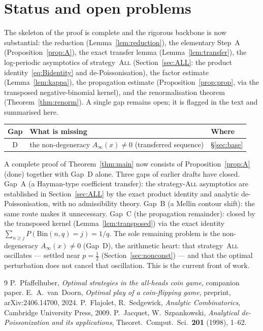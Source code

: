 \documentclass[11pt]{article}
\theoremstyle{definition}
\newcommand{\All}{\textsc{All}}
\begin{document}
\section{Status and open problems}\label{sec:status}

The skeleton of the proof is complete and the rigorous backbone is now
substantial: the reduction (Lemma~\ref{lem:reduction}), the elementary
Step~A (Proposition~\ref{prop:A}), the exact transfer lemma
(Lemma~\ref{lem:transfer}), the log-periodic asymptotics of
strategy~\All{} (Section~\ref{sec:ALL}: the product
identity~\eqref{eq:Bidentity} and de-Poissonisation), the factor
estimate (Lemma~\ref{lem:kappa}), the propagation estimate
(Proposition~\ref{prop:prop}, via the transposed negative-binomial
kernel), and the renormalisation theorem (Theorem~\ref{thm:renorm}).
A single gap remains open; it is flagged in the text and summarised
here.

\begin{center}
\renewcommand{\arraystretch}{1.3}
\begin{tabular}{@{}cll@{}}
\hline
\textbf{Gap} & \textbf{What is missing} & \textbf{Where} \\
\hline
D & the non-degeneracy $A_\infty(x)\ne0$ (transferred sequence)
  & \S\ref{sec:base} \\
\hline
\end{tabular}
\end{center}

\noindent A complete proof of Theorem~\ref{thm:main} now consists of
Proposition~\ref{prop:A} (done) together with Gap~D alone. Three gaps
of earlier drafts have closed. Gap~A (a Hayman-type coefficient
transfer): the strategy-\All{} asymptotics are established in
Section~\ref{sec:ALL} by the exact product identity and analytic
de-Poissonisation, with no admissibility theory. Gap~B (a Mellin
contour shift): the same route makes it unnecessary. Gap~C (the
propagation remainder): closed by the transposed kernel
(Lemma~\ref{lem:transposed}) via the exact identity
$\sum_{n\ge j}P(\mathrm{Bin}(n,q)=j)=1/q$. The sole remaining problem
is the non-degeneracy $A_\infty(x)\ne0$ (Gap~D), the arithmetic
heart: that strategy~\All{} oscillates --- settled near $p=\tfrac12$
(Section~\ref{sec:nonconst}) --- and that the optimal perturbation
does not cancel that oscillation. This is the current front of work.

\begin{thebibliography}{9}
  P.~Pfaffelhuber,
  \emph{Optimal strategies in the all-heads coin game},
  companion paper.
  E.~A.~van~Doorn,
  \emph{Optimal play of a coin-flipping game},
  preprint, arXiv:2406.14700, 2024.
  P.~Flajolet, R.~Sedgewick,
  \emph{Analytic Combinatorics},
  Cambridge University Press, 2009.
  P.~Jacquet, W.~Szpankowski,
  \emph{Analytical de-Poissonization and its applications},
  Theoret.\ Comput.\ Sci.\ \textbf{201} (1998), 1--62.
\end{thebibliography}
\end{document}
